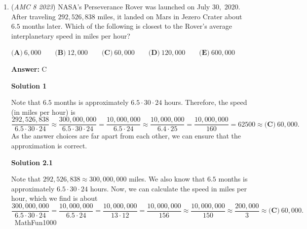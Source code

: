 \begin{enumerate}
\textbf{Solution 2}

Because Harold ate $\frac14$ of the pie, there must be $\frac34$ of the pie he had at the start left. Because the moose ate $\frac13$ of the pie, there must be $\frac23$ of the pie the moose had at the start left. Because the porcupine ate $\frac13$ of the pie, there must be $\frac23$ of the pie the porcupine had at the start left. Therefore, the answer must be $\frac34\times\frac23\times\frac23=\boxed{\textbf{(D)}\ \frac{1}{3}}$ of the pie left.

 \textbf{Remark} This problem is a great example of the implementation of \textbf{remaining portions}. This concept, in short, refers to the method of finding out what remains of a whole when part of it is taken. If you look closely at our solution, we can see that the denominator is the same when we said Harold ate $\frac14$ of the pie and we got $\frac34$ of the pie left. We can also see the numerator is just the denominator minus the old denominator.

 


	\item (\textit{AMC 8 2023}) NASA’s Perseverance Rover was launched on July $30,$ $2020.$ After traveling $292{,}526{,}838$ miles, it landed on Mars in Jezero Crater about $6.5$ months later. Which of the following is closest to the Rover’s average interplanetary speed in miles per hour?


 $\textbf{(A)}\ 6{,}000 \qquad \textbf{(B)}\ 12{,}000 \qquad \textbf{(C)}\ 60{,}000 \qquad \textbf{(D)}\ 120{,}000 \qquad \textbf{(E)}\ 600{,}000$

 \textbf{Answer: }C



\textbf{Solution 1}

Note that $6.5$ months is approximately $6.5\cdot30\cdot24$ hours. Therefore, the speed (in miles per hour) is 
 \[\frac{292{,}526{,}838}{6.5\cdot30\cdot24} \approx \frac{300{,}000{,}000}{6.5\cdot30\cdot24} = \frac{10{,}000{,}000}{6.5\cdot24} \approx \frac{10{,}000{,}000}{6.4\cdot25} = \frac{10{,}000{,}000}{160} = 62500 \approx \boxed{\textbf{(C)}\ 60{,}000}.\]As the answer choices are far apart from each other, we can ensure that the approximation is correct.

 



\textbf{Solution 2.1}

Note that $292{,}526{,}838 \approx 300{,}000{,}000$ miles. We also know that $6.5$ months is approximately $6.5\cdot30\cdot24$ hours. Now, we can calculate the speed in miles per hour, which we find is about
 \[\dfrac{300{,}000{,}000}{6.5\cdot30\cdot24}=\dfrac{10{,}000{,}000}{6.5\cdot24}=\dfrac{10{,}000{,}000}{13\cdot12}=\dfrac{10{,}000{,}000}{156}\approx\dfrac{10{,}000{,}000}{150}\approx\dfrac{200{,}000}{3}\approx\boxed{\textbf{(C)}\ 60{,}000}.\]~MathFun1000


\end{enumerate}
